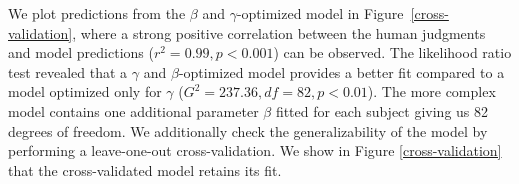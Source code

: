 \documentclass[10pt,a4paper]{article}
\begin{document}



 

We plot predictions from the $\beta$ and $\gamma$-optimized model in Figure~\ref{cross-validation}, where a strong positive correlation between the human judgments and model predictions ($r^2 = 0.99, p < 0.001$) can be observed. The likelihood ratio test revealed that a $\gamma$ and $\beta$-optimized model provides a better fit compared to a model optimized only for $\gamma$ ($G^2 = 237.36, df = 82, p < 0.01$). The more complex model contains one additional parameter $\beta$ fitted for each subject giving us 82 degrees of freedom. We additionally check the generalizability of the model by performing a leave-one-out cross-validation. We show in Figure \ref{cross-validation} that the cross-validated model retains its fit.
\end{document}
